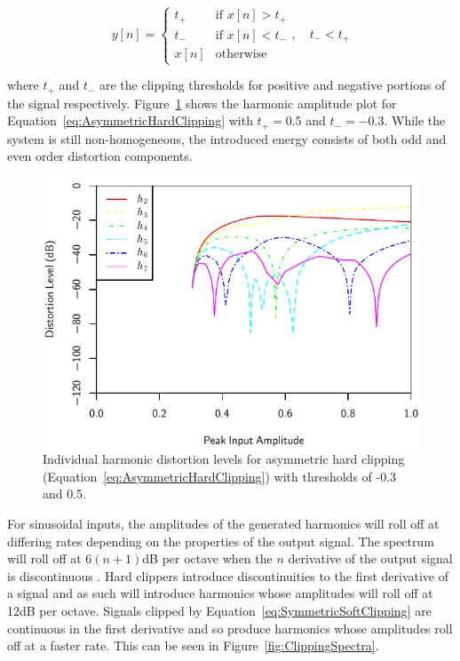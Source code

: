 			\begin{equation}
				y[n] = \begin{cases}
					t_{+} & \text{if $x[n] > t_{+}$} \\
					t_{-} & \text{if $x[n] < t_{-}$} \\
					x[n] & \text{otherwise}
				\end{cases}, \quad t_{-} < t_{+}
				\label{eq:AsymmetricHardClipping}
			\end{equation}

			where $t_{+}$ and $t_{-}$ are the clipping thresholds for positive and negative portions of the
			signal respectively. Figure~\ref{fig:AsymmetricHardClippingHarmonics} shows the harmonic amplitude
			plot for Equation~\ref{eq:AsymmetricHardClipping} with $t_{+} = 0.5$ and $t_{-} = -0.3$. While the
			system is still non-homogeneous, the introduced energy consists of both odd and even order
			distortion components.

			\begin{figure}[h!]
				\centering
				\includegraphics{chapter5/Images/AsymmetricHardClippingHarmonics.pdf}
				\caption{Individual harmonic distortion levels for asymmetric hard clipping
					 (Equation~\ref{eq:AsymmetricHardClipping}) with thresholds of -0.3 and 0.5.}
				\label{fig:AsymmetricHardClippingHarmonics}
			\end{figure}

			For sinusoidal inputs, the amplitudes of the generated harmonics will roll off at differing rates
			depending on the properties of the output signal. The spectrum will roll off at $6(n+1)$dB per
			octave when the $n$ derivative of the output signal is discontinuous
			\citep{kraght2000aliasing}.  Hard clippers introduce discontinuities to the first derivative of a
			signal and as such will introduce harmonics whose amplitudes will roll off at 12dB per octave.
			Signals clipped by Equation~\ref{eq:SymmetricSoftClipping} are continuous in the first derivative
			and so produce harmonics whose amplitudes roll off at a faster rate. This can be seen in
			Figure~\ref{fig:ClippingSpectra}.

